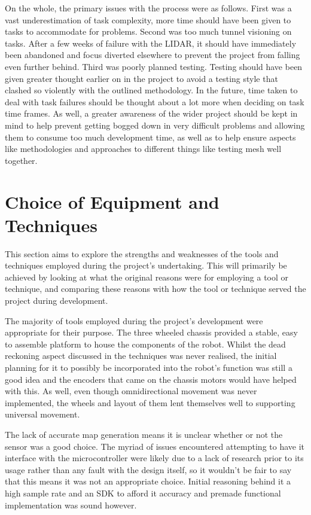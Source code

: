 		On the whole, the primary issues with the process were as follows. First was a vast underestimation of task complexity, more time should have been given to tasks to accommodate for problems. Second was too much tunnel visioning on tasks. After a few weeks of failure with the LIDAR, it should have immediately been abandoned and focus diverted elsewhere to prevent the project from falling even further behind. Third was poorly planned testing. Testing should have been given greater thought earlier on in the project to avoid a testing style that clashed so violently with the outlined methodology. In the future, time taken to deal with task failures should be thought about a lot more when deciding on task time frames. As well, a greater awareness of the wider project should be kept in mind to help prevent getting bogged down in very difficult problems and allowing them to consume too much development time, as well as to help ensure aspects like methodologies and approaches to different things like testing mesh well together.
	
	
		\section{Choice of Equipment and Techniques}
		This section aims to explore the strengths and weaknesses of the tools and techniques employed during the project's undertaking. This will primarily be achieved by looking at what the original reasons were for employing a tool or technique, and comparing these reasons with how the tool or technique served the project during development.
		
		The majority of tools employed during the project's development were appropriate for their purpose. The three wheeled chassis provided a stable, easy to assemble platform to house the components of the robot. Whilst the dead reckoning aspect discussed in the techniques was never realised, the initial planning for it to possibly be incorporated into the robot's function was still a good idea and the encoders that came on the chassis motors would have helped with this. As well, even though omnidirectional movement was never implemented, the wheels and layout of them lent themselves well to supporting universal movement.
		
		The lack of accurate map generation means it is unclear whether or not the sensor was a good choice. The myriad of issues encountered attempting to have it interface with the microcontroller were likely due to a lack of research prior to its usage rather than any fault with the design itself, so it wouldn't be fair to say that this means it was not an appropriate choice. Initial reasoning behind it a high sample rate and an SDK to afford it accuracy and premade functional implementation was sound however.
		
